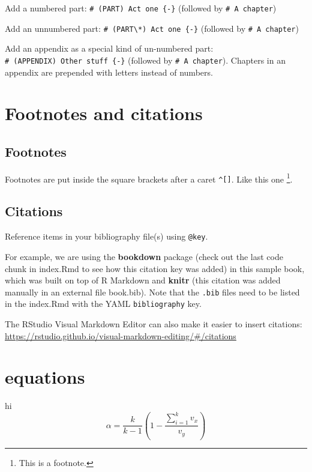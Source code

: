 \documentclass[
]{book}
\begin{document}
Add a numbered part: \texttt{\#\ (PART)\ Act\ one\ \{-\}} (followed by \texttt{\#\ A\ chapter})

Add an unnumbered part: \texttt{\#\ (PART\textbackslash{}*)\ Act\ one\ \{-\}} (followed by \texttt{\#\ A\ chapter})

Add an appendix as a special kind of un-numbered part: \texttt{\#\ (APPENDIX)\ Other\ stuff\ \{-\}} (followed by \texttt{\#\ A\ chapter}). Chapters in an appendix are prepended with letters instead of numbers.

\hypertarget{footnotes-and-citations}{%
\chapter{Footnotes and citations}\label{footnotes-and-citations}}

\hypertarget{footnotes}{%
\section{Footnotes}\label{footnotes}}

Footnotes are put inside the square brackets after a caret \texttt{\^{}{[}{]}}. Like this one \footnote{This is a footnote.}.

\hypertarget{citations}{%
\section{Citations}\label{citations}}

Reference items in your bibliography file(s) using \texttt{@key}.

For example, we are using the \textbf{bookdown} package \citep{R-bookdown} (check out the last code chunk in index.Rmd to see how this citation key was added) in this sample book, which was built on top of R Markdown and \textbf{knitr} \citep{xie2015} (this citation was added manually in an external file book.bib).
Note that the \texttt{.bib} files need to be listed in the index.Rmd with the YAML \texttt{bibliography} key.

The RStudio Visual Markdown Editor can also make it easier to insert citations: \url{https://rstudio.github.io/visual-markdown-editing/\#/citations}

\hypertarget{equations}{%
\chapter{equations}\label{equations}}

hi
\[\alpha=\frac{k}{k-1}\left( 1-\frac{\sum_{i=1}^kv_x}{v_y}\right)\]
\end{document}
